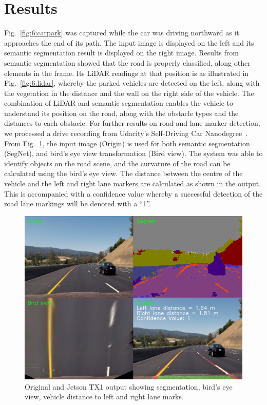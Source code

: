 \section{Results}
Fig.~\ref{fig:6:carpark} was captured while the car was driving northward as it approaches the end of its path. The input image is displayed on the left and its semantic segmentation result is displayed on the right image. Results from semantic segmentation showed that the road is properly classified, along other elements in the frame. Its LiDAR readings at that position is as illustrated in Fig.~\ref{fig:6:lidar}, whereby the parked vehicles are detected on the left, along with the vegetation in the distance and the wall on the right side of the vehicle. The combination of LiDAR and semantic segmentation enables the vehicle to understand its position on the road, along with the obstacle types and the distances to each obstacle. For further results on road and lane marker detection, we processed a drive recording from Udacity's Self-Driving Car Nanodegree~\cite{udacity_self-driving_2017}. From Fig.~\ref{fig:6:segnetroad}, the input image (Origin) is used for both semantic segmentation (SegNet), and bird's eye view transformation (Bird view). The system was able to identify objects on the road scene, and the curvature of the road can be calculated using the bird's eye view. The distance between the centre of the vehicle and the left and right lane markers are calculated as shown in the output. This is accompanied with a confidence value whereby a successful detection of the road lane markings will be denoted with a ``1''.  

\begin{figure}[H]
	\centering
	\includegraphics[width=0.8\linewidth]{segnet_road}
	\caption[Visual navigation output]{Original and Jetson TX1 output showing segmentation, bird’s eye view, vehicle distance to left and right lane marks.}
	\label{fig:6:segnetroad}
\end{figure}

